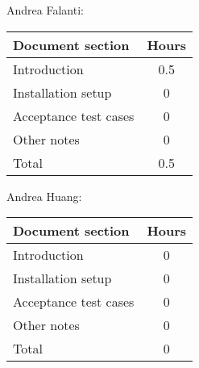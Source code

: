 Andrea Falanti:

\begin{tabular}{|l|c|}
    \hline
    Document section & Hours\\
    \hline
     Introduction & 0.5\\
     Installation setup & 0\\
     Acceptance test cases & 0\\
     Other notes & 0\\
     \hline
     Total & 0.5\\
     \hline
\end{tabular}

\vskip 0.3in

Andrea Huang:

\begin{tabular}{|l|c|}
    \hline
    Document section & Hours \\
    \hline
     Introduction & 0\\
     Installation setup & 0\\
     Acceptance test cases & 0\\
     Other notes & 0\\
     \hline
     Total & 0\\
     \hline
\end{tabular}